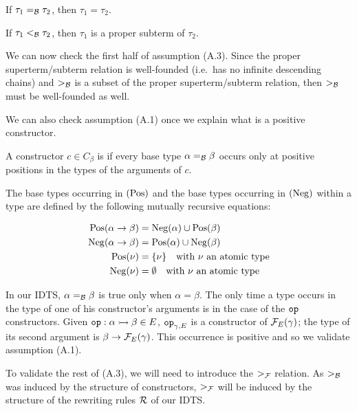 \begin{corollary}
  If $\tau_1 =_{\mathcal{B}} \tau_2$, then $\tau_1 = \tau_2$.
\end{corollary}

\begin{corollary}
  If $\tau_1 <_{\mathcal{B}} \tau_2$, then $\tau_1$ is a proper subterm of $\tau_2$.
\end{corollary}

We can now check the first half of assumption (A.3). Since the proper
superterm/subterm relation is well-founded (i.e.\ has no infinite
descending chains) and $>_{\mathcal{B}}$ is a subset of the proper superterm/subterm
relation, then $>_{\mathcal{B}}$ must be well-founded as well.

We can also check assumption (A.1) once we explain what is a positive
constructor.

\begin{definition}
  A constructor $c \in C_\beta$ is  if every base type
  $\alpha =_{\mathcal{B}} \beta$ occurs only at positive positions in the types of
  the arguments of $c$.
\end{definition}

\begin{definition}
  The base types occurring in  $(\operatorname{Pos})$ and the
  base types occurring in  $(\operatorname{Neg})$ within a type
  are defined by the following mutually recursive equations:

  \begin{align*}
    \operatorname{Pos}(\alpha \to \beta) &= \operatorname{Neg}(\alpha) \cup \operatorname{Pos}(\beta) \\
    \operatorname{Neg}(\alpha \to \beta) &= \operatorname{Pos}(\alpha) \cup \operatorname{Neg}(\beta) \\
    \operatorname{Pos}(\nu) &= \{ \nu \} \text{\quad with $\nu$ an atomic type} \\
    \operatorname{Neg}(\nu) &= \emptyset \text{\quad with $\nu$ an atomic type}
  \end{align*}
\end{definition}

In our IDTS, $\alpha =_{\mathcal{B}} \beta$ is true only when $\alpha = \beta$. The
only time a type occurs in the type of one of his constructor's arguments
is in the case of the $\mathtt{op}$ constructors. Given
$\mathtt{op} : \alpha \rightarrowtail \beta \in E$, $\mathtt{op}_{\gamma,E}$ is a constructor
of $\mathcal{F}_E(\gamma)$; the type of its second argument is
$\beta \to \mathcal{F}_E(\gamma)$. This occurrence is positive and so we validate
assumption (A.1).

To validate the rest of (A.3), we will need to introduce the $>_{\mathcal{F}}$
relation. As $>_{\mathcal{B}}$ was induced by the structure of constructors, $>_{\mathcal{F}}$
will be induced by the structure of the rewriting rules $\mathcal{R}$ of our
IDTS.


